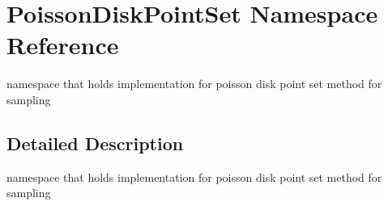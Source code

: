 \hypertarget{namespacePoissonDiskPointSet}{}\section{Poisson\+Disk\+Point\+Set Namespace Reference}
\label{namespacePoissonDiskPointSet}


namespace that holds implementation for poisson disk point set method for sampling  




\subsection{Detailed Description}
namespace that holds implementation for poisson disk point set method for sampling 